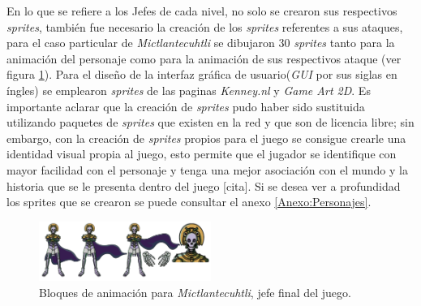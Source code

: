 En lo que se refiere a los Jefes de cada nivel, no solo se crearon sus respectivos \textit{sprites}, también fue necesario la creación de los \textit{sprites} referentes a sus ataques, para el caso particular de \textit{Mictlantecuhtli} se dibujaron 30 \textit{sprites} tanto para la animación del personaje como para la animación de sus respectivos ataque (ver figura \ref{fig:Mictlantecutli}). Para el diseño de la interfaz gráfica de usuario(\textit{GUI} por sus siglas en íngles) se emplearon \textit{sprites} de las paginas \textit{Kenney.nl} y \textit{Game Art 2D}. Es importante aclarar que la creación de \textit{sprites} pudo haber sido sustituida utilizando paquetes de \textit{sprites} que existen en la red y que son de licencia libre; sin embargo, con la creación de \textit{sprites} propios para el juego se consigue crearle una identidad visual propia al juego, esto permite que el jugador se identifique con mayor facilidad con el personaje y tenga una mejor asociación con el mundo y la historia que se le presenta dentro del juego [cita]. Si se desea ver a profundidad los {sprites} que se crearon se puede consultar el anexo \ref{Anexo:Personajes}. 


\begin{figure}[h]
	\centering
	\includegraphics[width=0.5\textwidth]{05TrabajoReali/imagenes/Mictlantecuhtli.png}
 	\caption{Bloques de animación para \textit{Mictlantecuhtli}, jefe final del juego.}
	\label{fig:Mictlantecutli}		
\end{figure}
